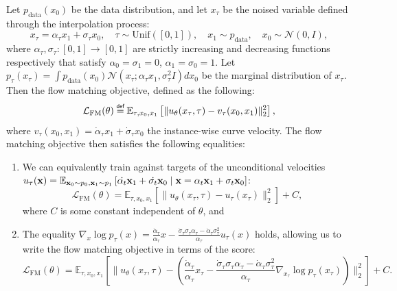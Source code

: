 \begin{theorem}
\label{thm:score_matching_fm}
Let $p_{\text{data}}(x_0)$ be the data distribution, and let $x_\tau$ be the noised variable defined through the interpolation process:
\begin{equation}
x_\tau = \alpha_\tau x_1 +\sigma_\tau x_0, \quad \tau \sim \mathrm{Unif}([0,1]), \quad x_1 \sim p_{\text{data}}, \quad x_0 \sim \mathcal{N}(0, I),
\end{equation}
where $\alpha_\tau, \sigma_\tau : [0,1] \to [0,1]$ are strictly increasing and decreasing functions respectively that satisfy $\alpha_0 = \sigma_1 = 0$, $\alpha_1 = \sigma_0 = 1$. Let $p_\tau(x_\tau) = \int p_{\text{data}}(x_0) \mathcal{N}(x_\tau; \alpha_\tau x_1, \sigma_\tau^2I) dx_0$ be the marginal distribution of $x_\tau$. Then the flow matching objective, defined as the following:
\begin{equation}
\mathcal{L}_\text{FM}(\theta) \myeq \mathbb{E}_{\tau, x_0, x_1} \left[ \|u_\theta(x_\tau, \tau) - v_\tau (x_0, x_1)\|_2^2 \right],
\end{equation}
where $v_\tau(x_0, x_1) = \dot \alpha_\tau x_1 + \dot \sigma_\tau x_0$ the instance-wise curve velocity. The flow matching objective then satisfies the following equalities:
\begin{enumerate}
    \item \label{enum:fm_pf_pt1} We can equivalently train against targets of the unconditional velocities  $u_\tau(\xx) = \E_{\xx_0 \sim p_0, \xx_1 \sim p_1}\left[ \dot{\alpha_t} \xx_1 + \dot{\sigma_t} \xx_0 \mid \xx = \alpha_t \xx_1 + \sigma_t \xx_0\right]$:
    \begin{equation}
        \mathcal{L}_\text{FM}(\theta) = \mathbb{E}_{\tau, x_0, x_1} \left[ \|u_\theta(x_\tau, \tau) - u_\tau (x_\tau)\|_2^2 \right] + C,
    \end{equation}
    where $C$ is some constant independent of $\theta$, and
    \item \label{enum:fm_pf_pt2} The equality $\nabla_x \log p_\tau (x) = \frac{\dot \alpha_\tau}{\alpha_\tau}x - \frac{\dot \sigma_\tau \sigma_\tau \alpha_\tau - \dot \alpha_\tau \sigma_\tau^2}{\alpha_\tau} u_\tau(x)$ holds, allowing us to write the flow matching objective in terms of the score:
    \begin{equation}
        \mathcal{L}_\text{FM}(\theta) = \mathbb{E}_{\tau, x_0, x_1} \left[ \|u_\theta(x_\tau, \tau) -\left( \frac{\dot \alpha_\tau}{\alpha_\tau} x_\tau - \frac{\dot \sigma_\tau \sigma_\tau \alpha_\tau - \dot \alpha_\tau \sigma_\tau^2}{\alpha_\tau}\nabla_{x_\tau} \log p_\tau (x_\tau) \right)\|_2^2 \right] + C.
    \end{equation}
\end{enumerate}
\end{theorem}
